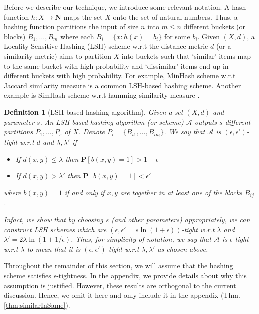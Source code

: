 \documentclass[12pt]{article}
\newtheorem{definition}[theorem]{Definition}
\newcommand{\mb}{\mathbf}
\newcommand{\mc}{\mathcal}
\begin{document}
\vspace{0.02in}\noindent Before we describe our technique, we introduce some relevant notation. A hash function $h: X \rightarrow \mb N$ maps the set $X$ onto the set of natural numbers. Thus, a hashing function partitions the input of size $n$ into $m \le n$ different buckets (or blocks) $B_1, \ldots, B_m$ where each $B_i = \{x : h(x) = b_i\}$ for some $b_i$. Given $(X, d)$, a Locality Sensitive Hashing (LSH) scheme w.r.t the distance metric $d$ (or a similarity metric) aims to partition $X$ into buckets such that `similar' items map to the same bucket with high probability and `dissimilar' items end up in different buckets with high probability. For example, MinHash scheme w.r.t Jaccard similarity measure \cite{broder2000min, broder1997resemblance} is a common LSH-based hashing scheme. Another example is SimHash scheme w.r.t hamming similarity measure \cite{charikar2002similarity}. 


\begin{definition}[LSH-based hashing algorithm]
\label{defn:LSHProperty}
Given a set $(X, d)$ and parameter $s$. An LSH-based hashing algorithm (or scheme) $\mc A$ outputs $s$ different partitions $P_1, \ldots, P_s$ of $X$. Denote $P_i = \{B_{i1}, \ldots, B_{in_i}\}$. We say that $\mc A$ is $(\epsilon, \epsilon')$-tight w.r.t $d$ and $\lambda, \lambda'$ if 

\begin{itemize}
	\item If $d(x, y) \le \lambda$ then  ${\mb P} [ b(x, y) = 1 ]  >  1 - \epsilon$
	\item If $d(x, y) > \lambda'$ then ${\mb P} [ b(x, y) = 1 ] < \epsilon'$
\end{itemize}
where $b(x, y) = 1$ if and only if $x, y$ are together in at least one of the blocks $B_{ij}$.

Infact, we show that by choosing $s$ (and other parameters) appropriately, we can construct LSH schemes which are $(\epsilon, \epsilon'=s\ln (1+\epsilon))$-tight w.r.t $\lambda$ and $\lambda' = 2\lambda \ln (1+1/\epsilon)$. Thus, for simplicity of notation, we say that $\mc A$ is $\epsilon$-tight w.r.t $\lambda$ to mean that it is $(\epsilon, \epsilon')$-tight w.r.t $\lambda, \lambda'$ as chosen above.
\end{definition}

\noindent Throughout the remainder of this section, we will assume that the hashing scheme satisfies $\epsilon$-tightness. In the appendix, we provide details about why this assumption is justified. However, these results are orthogonal to the current discussion. Hence, we omit it here and only include it in the appendix (Thm. \ref{thm:similarInSame}).  
\end{document}
